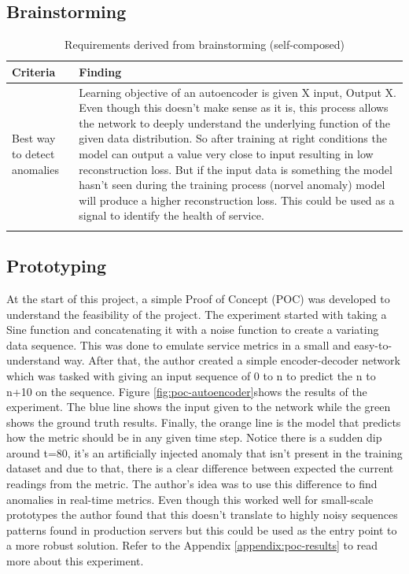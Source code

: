 
\subsection{Brainstorming}

\begin{longtable}{|p{50mm}|p{105mm}|}
    \hline
    \textbf{Criteria} &
    \textbf{Finding} \\ \hline

    Best way to detect anomalies &
    Learning objective of an autoencoder is given X input, Output X. Even though this doesn’t make sense as it is, this process allows the network to deeply understand the underlying function of the given data distribution. So after training at right conditions the model can output a value very close to input resulting in low reconstruction loss. But if the input data is something the model hasn’t seen during the training process (norvel anomaly) model will produce a higher reconstruction loss. This could be used as a signal to identify the health of service. \\ \hline

    \caption{Requirements derived from brainstorming (self-composed)}
\end{longtable}

\subsection{Prototyping}

At the start of this project, a simple Proof of Concept (POC) was developed to understand the feasibility of the project. The experiment started with taking a Sine function and concatenating it with a noise function to create a variating data sequence. This was done to emulate service metrics in a small and easy-to-understand way. After that, the author created a simple encoder-decoder network which was tasked with giving an input sequence of 0 to n to predict the n to n+10 on the sequence. Figure \ref{fig:poc-autoencoder}shows the results of the experiment. The blue line shows the input given to the network while the green shows the ground truth results. Finally, the orange line is the model that predicts how the metric should be in any given time step. Notice there is a sudden dip around t=80, it's an artificially injected anomaly that isn't present in the training dataset and due to that, there is a clear difference between expected the current readings from the metric. The author's idea was to use this difference to find anomalies in real-time metrics. Even though this worked well for small-scale prototypes the author found that this doesn't translate to highly noisy sequences patterns found in production servers but this could be used as the entry point to a more robust solution. Refer to the Appendix \ref{appendix:poc-results} to read more about this experiment.

